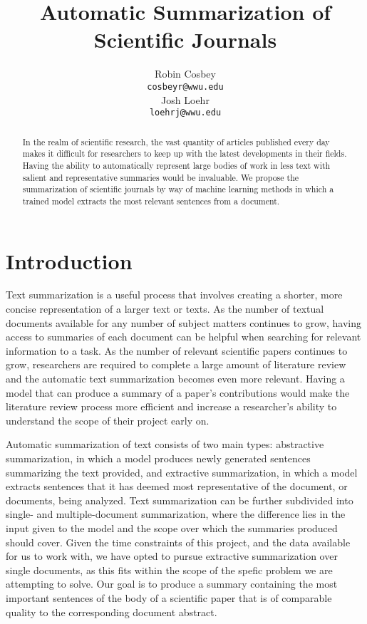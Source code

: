 \documentclass[11pt]{article}
\begin{document}
\title{Automatic Summarization of Scientific Journals}

\author{Robin Cosbey \\
  {\tt cosbeyr@wwu.edu} \\\And
  Josh Loehr \\
  {\tt loehrj@wwu.edu} \\}

\maketitle

\begin{abstract}
In the realm of scientific research, the vast quantity of articles published every day makes it difficult for researchers to keep up with the latest developments in their fields. 
Having the ability to automatically represent large bodies of work in less text with salient and representative summaries would be invaluable.
We propose the summarization of scientific journals by way of machine learning methods in which a trained model extracts the most relevant sentences from a document. 
\end{abstract}

\section{Introduction}
	Text summarization is a useful process that involves creating a shorter, more concise representation of a larger text or texts. As the number of textual documents available for any number of subject matters continues to grow, having access to summaries of each document can be helpful when searching for relevant information to a task. As the number of relevant scientific papers continues to grow, researchers are required to complete a large amount of literature review and the automatic text summarization becomes even more relevant. Having a model that can produce a summary of a paper’s contributions would make the literature review process more efficient and increase a researcher’s ability to understand the scope of their project early on. 

	Automatic summarization of text consists of two main types: abstractive summarization, in which a model produces newly generated sentences summarizing the text provided, and extractive summarization, in which a model extracts sentences that it has deemed most representative of the document, or documents, being analyzed. Text summarization can be further subdivided into single- and multiple-document summarization, where the difference lies in the input given to the model and the scope over which the summaries produced should cover. Given the time constraints of this project, and the data available for us to work with, we have opted to pursue extractive summarization over single documents, as this fits within the scope of the spefic problem we are attempting to solve. Our goal is to produce a summary containing the most important sentences of the body of a scientific paper that is of comparable quality to the corresponding document abstract.
\end{document}

